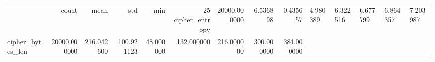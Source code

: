 \begin{tabular}{lrrrrrrrr}
\toprule
 & count & mean & std & min & 25%
\midrule
cipher_entropy & 20000.000000 & 6.536898 & 0.435657 & 4.980389 & 6.322516 & 6.677799 & 6.864357 & 7.203987 \\
cipher_bytes_len & 20000.000000 & 216.042600 & 100.921123 & 48.000000 & 132.000000 & 216.000000 & 300.000000 & 384.000000 \\
\bottomrule
\end{tabular}
